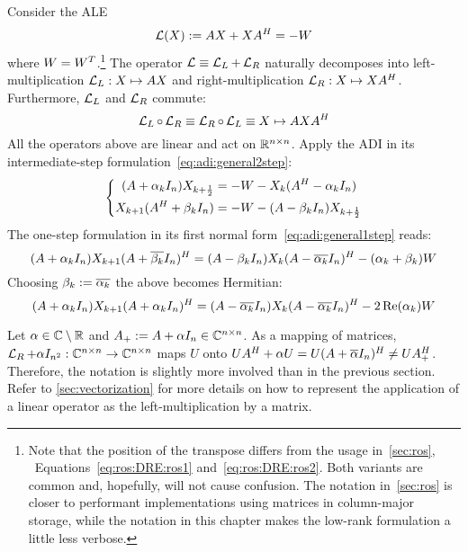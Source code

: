 Consider the \ac{ALE}
\begin{equation}
\label{eq:adi:ale}
  \operatorname{\mathcal L}(X) := AX + XA^H = -W
\end{equation}
where $W = W^T$.\footnote{%
\label{footnote:adi:transpose}
  Note that the position of the transpose differs from the usage in~\autoref{sec:ros},
  \eg~Equations~\eqref{eq:ros:DRE:ros1} and~\eqref{eq:ros:DRE:ros2}.
  Both variants are common and, hopefully, will not cause confusion.
  The notation in~\autoref{sec:ros} is closer to performant implementations using matrices in column-major storage,
  while the notation in this chapter makes the low-rank formulation a little less verbose.
}
The \Lyapunov operator $\operatorname{\mathcal L} \equiv \operatorname{\mathcal L}_L + \operatorname{\mathcal L}_R$ naturally decomposes into
left-multiplication $\operatorname{\mathcal L}_L : X \mapsto AX$ and
right-multiplication $\operatorname{\mathcal L}_R : X \mapsto XA^H$.
Furthermore, $\operatorname{\mathcal L}_L$ and $\operatorname{\mathcal L}_R$ commute:
\begin{equation}
  \operatorname{\mathcal L}_L \circ \operatorname{\mathcal L}_R \equiv \operatorname{\mathcal L}_R \circ \operatorname{\mathcal L}_L \equiv X \mapsto AXA^H
\end{equation}
All the operators above are linear and act on $\mathbb{R}^{n\times n}$.
Apply the \ac{ADI} in its intermediate-step formulation~\eqref{eq:adi:general2step}:
\begin{equation}
  \left\{
  \begin{aligned}
    (A + \alpha_k I_n) X_{k+\frac{1}{2}} &= -W - X_k (A^H - \alpha_k I_n) \\
    X_{k+1} (A^H + \beta_k I_n) &= -W - (A - \beta_k I_n) X_{k+\frac{1}{2}}
  \end{aligned}
  \right.
\end{equation}
The one-step formulation in its first normal form~\eqref{eq:adi:general1step} reads:
\begin{equation}
  (A + \alpha_k I_n)
  X_{k+1}
  (A + \conj{\beta_k} I_n)^\HT
  =
  (A - \beta_k I_n)
  X_k
  (A - \conj{\alpha_k} I_n)^\HT
  - (\alpha_k + \beta_k)
  W
\end{equation}
Choosing $\beta_k := \conj{\alpha_k}$
the above becomes Hermitian:
\begin{equation}
\label{eq:adi:ale1step}
  (A + \alpha_k I_n)
  X_{k+1}
  (A + \alpha_k I_n)^\HT
  =
  (A - \conj{\alpha_k} I_n)
  X_k
  (A - \conj{\alpha_k} I_n)^\HT
  - 2\Re(\alpha_k)
  W
\end{equation}

\begin{remark}
  Let $\alpha\in\mathbb{C}\setminus\mathbb{R}$ and $A_+ := A+\alpha I_n \in\mathbb{C}^{n\times n}$.
  As a mapping of matrices,
  $\operatorname{\mathcal L}_R + \alpha I_{n^2} : \mathbb{C}^{n\times n} \to \mathbb{C}^{n\times n}$ maps $U$ onto
  $
    U A^\HT + \alpha U =
    U(A+\conj{\alpha} I_n)^\HT \neq
    U A_+^\HT
  $.
  Therefore, the notation is slightly more involved than in the previous section.
  Refer to \autoref{sec:vectorization} for more details on how to represent the application of a linear operator as the left-multiplication by a matrix.
\end{remark}

